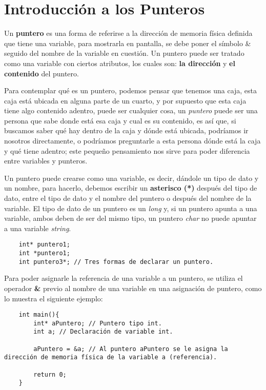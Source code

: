 \section{Introducción a los Punteros}

Un \textbf{puntero} es una forma de referirse a la dirección de memoria física definida que tiene una variable, para mostrarla en pantalla, se debe poner el símbolo \& seguido del nombre de la variable en cuestión. Un puntero puede ser tratado como una variable con ciertos atributos, los cuales son: \textbf{la dirección} y \textbf{el contenido} del puntero.

Para contemplar qué es un puntero, podemos pensar que tenemos una caja, esta caja está ubicada en alguna parte de un cuarto, y por supuesto que esta caja tiene algo contenido adentro, puede ser cualquier cosa, un \textit{puntero} puede ser una persona que sabe donde está esa caja y cual es su contenido, es así que, si buscamos saber qué hay dentro de la caja y dónde está ubicada, podríamos ir nosotros directamente, o podríamos preguntarle a esta persona dónde está la caja y qué tiene adentro; este pequeño pensamiento nos sirve para poder diferencia entre variables y punteros.

Un puntero puede crearse como una variable, es decir, dándole un tipo de dato y un nombre, para hacerlo, debemos escribir un \textbf{asterisco (*)} después del tipo de dato, entre el tipo de dato y el nombre del puntero o después del nombre de la variable. El tipo de dato de un puntero es un \textit{long} y, si un puntero apunta a una variable, ambos deben de ser del mismo tipo, un puntero \textit{char} no puede apuntar a una variable \textit{string}.
\begin{lstlisting}
    int* puntero1;
    int *puntero1;
    int puntero3*; // Tres formas de declarar un puntero.
\end{lstlisting}

Para poder asignarle la referencia de una variable a un puntero, se utiliza el operador \textbf{\&} previo al nombre de una variable en una asignación de puntero, como lo muestra el siguiente ejemplo:
\begin{lstlisting}
    int main(){
        int* aPuntero; // Puntero tipo int.
        int a; // Declaración de variable int.
        
        aPuntero = &a; // Al puntero aPuntero se le asigna la dirección de memoria física de la variable a (referencia).
    
        return 0;
    }
\end{lstlisting}

